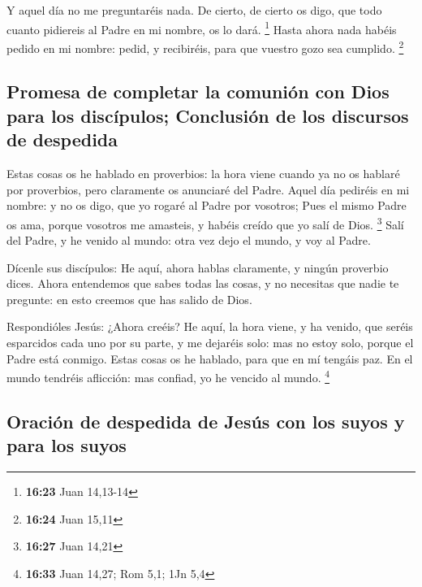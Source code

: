  Y aquel día no me preguntaréis nada. De cierto, de cierto
os digo, que todo cuanto pidiereis al Padre en mi nombre, os lo dará.
\footnote{\textbf{16:23} Juan 14,13-14}  Hasta ahora nada
habéis pedido en mi nombre: pedid, y recibiréis, para que vuestro gozo
sea cumplido. \footnote{\textbf{16:24} Juan 15,11}

\hypertarget{promesa-de-completar-la-comuniuxf3n-con-dios-para-los-discuxedpulos-conclusiuxf3n-de-los-discursos-de-despedida}{%
\subsection{Promesa de completar la comunión con Dios para los
discípulos; Conclusión de los discursos de
despedida}\label{promesa-de-completar-la-comuniuxf3n-con-dios-para-los-discuxedpulos-conclusiuxf3n-de-los-discursos-de-despedida}}

 Estas cosas os he hablado en proverbios: la hora viene
cuando ya no os hablaré por proverbios, pero claramente os anunciaré del
Padre.  Aquel día pediréis en mi nombre: y no os digo, que
yo rogaré al Padre por vosotros;  Pues el mismo Padre os
ama, porque vosotros me amasteis, y habéis creído que yo salí de Dios.
\footnote{\textbf{16:27} Juan 14,21}  Salí del Padre, y he
venido al mundo: otra vez dejo el mundo, y voy al Padre.

 Dícenle sus discípulos: He aquí, ahora hablas claramente,
y ningún proverbio dices.  Ahora entendemos que sabes todas
las cosas, y no necesitas que nadie te pregunte: en esto creemos que has
salido de Dios.

 Respondióles Jesús: ¿Ahora creéis?  He aquí,
la hora viene, y ha venido, que seréis esparcidos cada uno por su parte,
y me dejaréis solo: mas no estoy solo, porque el Padre está conmigo.
 Estas cosas os he hablado, para que en mí tengáis paz. En
el mundo tendréis aflicción: mas confiad, yo he vencido al mundo.
\footnote{\textbf{16:33} Juan 14,27; Rom 5,1; 1Jn 5,4}

\hypertarget{oraciuxf3n-de-despedida-de-jesuxfas-con-los-suyos-y-para-los-suyos}{%
\subsection{Oración de despedida de Jesús con los suyos y para los
suyos}\label{oraciuxf3n-de-despedida-de-jesuxfas-con-los-suyos-y-para-los-suyos}}

